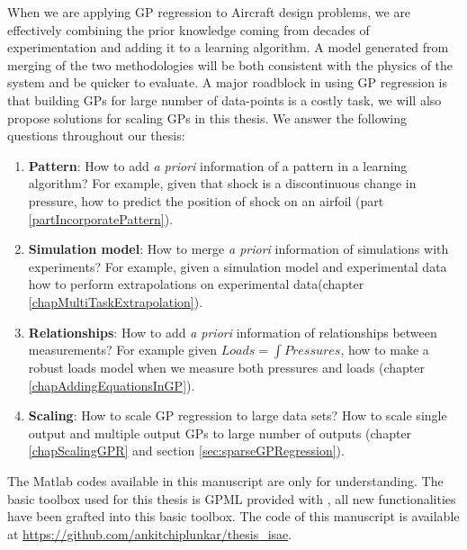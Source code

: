 When we are applying GP regression to Aircraft design problems, we are effectively combining the prior knowledge coming from decades of experimentation and adding it to a learning algorithm. A model generated from merging of the two methodologies will be both consistent with the physics of the system and be quicker to evaluate. A major roadblock in using GP regression is that building GPs for large number of data-points is a costly task, we will also propose solutions for scaling GPs in this thesis. We answer the following questions throughout our thesis:

\begin{enumerate}
\item \textbf{Pattern}: How to add \textit{a priori} information of a pattern in a learning algorithm? For example, given that shock is a discontinuous change in pressure, how to predict the position of shock on an airfoil (part \ref{partIncorporatePattern}). 
\item \textbf{Simulation model}: How to merge \textit{a priori} information of simulations with experiments? For example, given a simulation model and experimental data how to perform extrapolations on experimental data(chapter \ref{chapMultiTaskExtrapolation}). 
\item \textbf{Relationships}: How to add \textit{a priori} information of relationships between measurements? For example given $Loads = \int Pressures$, how to make a robust loads model when we measure both pressures and loads (chapter \ref{chapAddingEquationsInGP}).
\item \textbf{Scaling}: How to scale GP regression to large data sets? How to scale single output and multiple output GPs to large number of outputs (chapter \ref{chapScalingGPR} and section \ref{sec:sparseGPRegression}).
\end{enumerate}

The Matlab codes available in this manuscript are only for understanding. The basic toolbox used for this thesis is GPML provided with \cite{Rasmussen2005}, all new functionalities have been grafted into this basic toolbox. The code of this manuscript is available at \url{https://github.com/ankitchiplunkar/thesis_isae}. 


